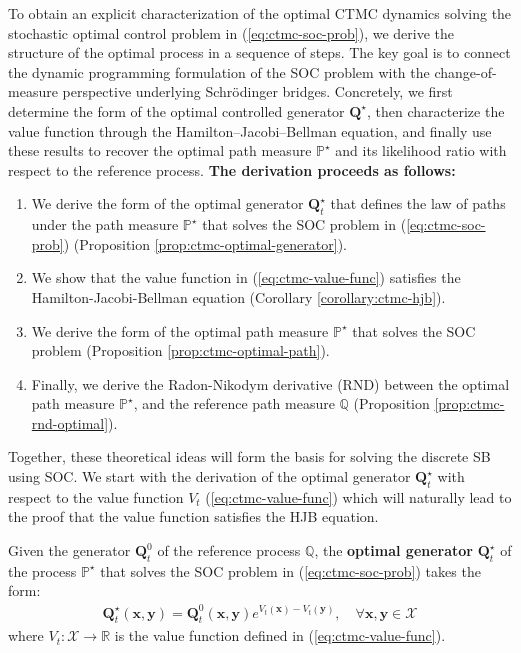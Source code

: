 \documentclass{article}
\begin{document}
To obtain an explicit characterization of the optimal CTMC dynamics solving the stochastic optimal control problem in (\ref{eq:ctmc-soc-prob}), we derive the structure of the optimal process in a sequence of steps. The key goal is to connect the dynamic programming formulation of the SOC problem with the change-of-measure perspective underlying Schrödinger bridges. Concretely, we first determine the form of the optimal controlled generator $\boldsymbol{Q}^\star$, then characterize the value function through the Hamilton–Jacobi–Bellman equation, and finally use these results to recover the optimal path measure $\mathbb{P}^\star$ and its likelihood ratio with respect to the reference process. \textbf{The derivation proceeds as follows:}
\begin{enumerate}
    \item [(i)] We derive the form of the optimal generator $\boldsymbol{Q}^\star_t$ that defines the law of paths under the path measure $\mathbb{P}^\star$ that solves the SOC problem in (\ref{eq:ctmc-soc-prob}) (Proposition \ref{prop:ctmc-optimal-generator}).
    \item[(ii)] We show that the value function in (\ref{eq:ctmc-value-func}) satisfies the Hamilton-Jacobi-Bellman equation (Corollary \ref{corollary:ctmc-hjb}).
    \item[(iv)] We derive the form of the optimal path measure $\mathbb{P}^\star$ that solves the SOC problem (Proposition \ref{prop:ctmc-optimal-path}).
    \item[(iii)] Finally, we derive the Radon-Nikodym derivative (RND) between the optimal path measure $\mathbb{P}^\star$, and the reference path measure $\mathbb{Q}$ (Proposition \ref{prop:ctmc-rnd-optimal}).
    
\end{enumerate}
Together, these theoretical ideas will form the basis for solving the discrete SB using SOC. We start with the derivation of the optimal generator $\boldsymbol{Q}^\star_t$ with respect to the value function $V_t$ (\ref{eq:ctmc-value-func}) which will naturally lead to the proof that the value function satisfies the HJB equation.

\begin{proposition}\label{prop:ctmc-optimal-generator}
    Given the generator $\boldsymbol{Q}^0_t$ of the reference process $\mathbb{Q}$, the \textbf{optimal generator} $\boldsymbol{Q}^\star_t$ of the process $\mathbb{P}^\star$ that solves the SOC problem in (\ref{eq:ctmc-soc-prob}) takes the form:
    \begin{align}
        \boldsymbol{Q}_t^\star(\boldsymbol{x}, \boldsymbol{y})=\boldsymbol{Q}^0_t(\boldsymbol{x},\boldsymbol{y})e^{V_t(\boldsymbol{x})-V_t(\boldsymbol{y})}, \quad \forall \boldsymbol{x},\boldsymbol{y}\in \mathcal{X}\tag{Optimal Generator}\label{eq:prop-optimal-generator}
    \end{align}
    where $V_t:\mathcal{X}\to \mathbb{R}$ is the value function defined in (\ref{eq:ctmc-value-func}).
\end{proposition}
\end{document}
